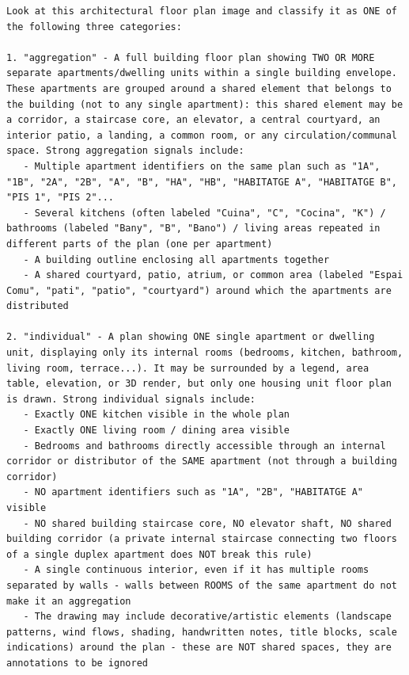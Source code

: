 \documentclass[12pt,a4paper,openright]{report}
\begin{document}
\begin{appendices}
\begin{lstlisting}[style=prompt]
Look at this architectural floor plan image and classify it as ONE of the following three categories:

1. "aggregation" - A full building floor plan showing TWO OR MORE separate apartments/dwelling units within a single building envelope. These apartments are grouped around a shared element that belongs to the building (not to any single apartment): this shared element may be a corridor, a staircase core, an elevator, a central courtyard, an interior patio, a landing, a common room, or any circulation/communal space. Strong aggregation signals include:
   - Multiple apartment identifiers on the same plan such as "1A", "1B", "2A", "2B", "A", "B", "HA", "HB", "HABITATGE A", "HABITATGE B", "PIS 1", "PIS 2"...
   - Several kitchens (often labeled "Cuina", "C", "Cocina", "K") / bathrooms (labeled "Bany", "B", "Bano") / living areas repeated in different parts of the plan (one per apartment)
   - A building outline enclosing all apartments together
   - A shared courtyard, patio, atrium, or common area (labeled "Espai Comu", "pati", "patio", "courtyard") around which the apartments are distributed

2. "individual" - A plan showing ONE single apartment or dwelling unit, displaying only its internal rooms (bedrooms, kitchen, bathroom, living room, terrace...). It may be surrounded by a legend, area table, elevation, or 3D render, but only one housing unit floor plan is drawn. Strong individual signals include:
   - Exactly ONE kitchen visible in the whole plan
   - Exactly ONE living room / dining area visible
   - Bedrooms and bathrooms directly accessible through an internal corridor or distributor of the SAME apartment (not through a building corridor)
   - NO apartment identifiers such as "1A", "2B", "HABITATGE A" visible
   - NO shared building staircase core, NO elevator shaft, NO shared building corridor (a private internal staircase connecting two floors of a single duplex apartment does NOT break this rule)
   - A single continuous interior, even if it has multiple rooms separated by walls - walls between ROOMS of the same apartment do not make it an aggregation
   - The drawing may include decorative/artistic elements (landscape patterns, wind flows, shading, handwritten notes, title blocks, scale indications) around the plan - these are NOT shared spaces, they are annotations to be ignored


\end{lstlisting}
\end{appendices}
\end{document}
